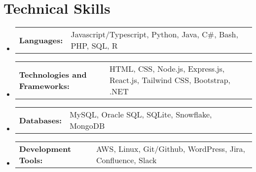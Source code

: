 \documentclass[letterpaper,11pt]{article}
\makeatletter
\newcommand{\resumeSubItem}[2]{ 
  \item
    \begin{tabular*}{\textwidth}{@{}l p{\dimexpr\textwidth-1.5cm}@{}}{\small\textbf{#1}}\hspace{0.5em} & {\small #2} \\ 
    \end{tabular*}\vspace{-6pt}
}
\newcommand{\resumeSubHeadingListStart}{\begin{itemize}[leftmargin=0.0in, label={}]}
\newcommand{\resumeSubHeadingListEnd}{\end{itemize}}
\makeatother
\begin{document}
\section{Technical Skills}
  \resumeSubHeadingListStart
    \resumeSubItem{Languages:}
      {Javascript/Typescript, Python, Java, C\#, Bash, PHP, SQL, R}
    \resumeSubItem{Technologies and Frameworks:}
      {HTML, CSS, Node.js, Express.js, React.js, Tailwind CSS, Bootstrap, .NET}
    \resumeSubItem{Databases:}
      {MySQL, Oracle SQL, SQLite, Snowflake, MongoDB}
    \resumeSubItem{Development Tools:}
      {AWS, Linux, Git/Github, WordPress, Jira, Confluence, Slack}
  \resumeSubHeadingListEnd
\end{document}
